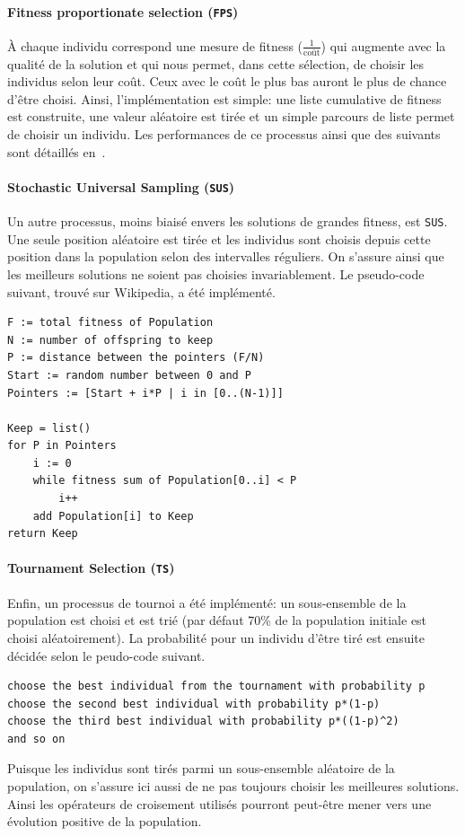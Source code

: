 \documentclass[10pt]{article}
\begin{document}
		\paragraph{Fitness proportionate selection (\texttt{FPS})}{
			À chaque individu correspond une mesure de fitness ($\frac{1}{\text{coût}}$) qui augmente avec la qualité de la solution et qui nous permet, dans cette sélection, de choisir les individus selon leur coût. Ceux avec le coût le plus bas auront le plus de chance d'être choisi. Ainsi, l'implémentation est simple: une liste cumulative de fitness est construite, une valeur aléatoire est tirée et un simple parcours de liste permet de choisir un individu. Les performances de ce processus ainsi que des suivants sont détaillés en~.
		}
		\paragraph{Stochastic Universal Sampling (\texttt{SUS})}{
			Un autre processus, moins biaisé envers les solutions de grandes fitness, est \texttt{SUS}. Une seule position aléatoire est tirée et les individus sont choisis depuis cette position dans la population selon des intervalles réguliers. On s'assure ainsi que les meilleurs solutions ne soient pas choisies invariablement. Le pseudo-code suivant, trouvé sur Wikipedia, a été implémenté.
			\begin{lstlisting}
F := total fitness of Population
N := number of offspring to keep
P := distance between the pointers (F/N)
Start := random number between 0 and P
Pointers := [Start + i*P | i in [0..(N-1)]]

Keep = list()
for P in Pointers
    i := 0
    while fitness sum of Population[0..i] < P
        i++
    add Population[i] to Keep
return Keep
			\end{lstlisting}
		}
		\paragraph{Tournament Selection (\texttt{TS})}{
		Enfin, un processus de tournoi a été implémenté: un sous-ensemble de la population est choisi et est trié (par défaut 70\% de la population initiale est choisi aléatoirement). La probabilité pour un individu d'être tiré est ensuite décidée selon le peudo-code suivant.
			\begin{lstlisting}
choose the best individual from the tournament with probability p
choose the second best individual with probability p*(1-p)
choose the third best individual with probability p*((1-p)^2)
and so on
			\end{lstlisting}		
		Puisque les individus sont tirés parmi un sous-ensemble aléatoire de la population, on s'assure ici aussi de ne pas toujours choisir les meilleures solutions. Ainsi les opérateurs de croisement utilisés pourront peut-être mener vers une évolution positive de la population.
		}
\end{document}
